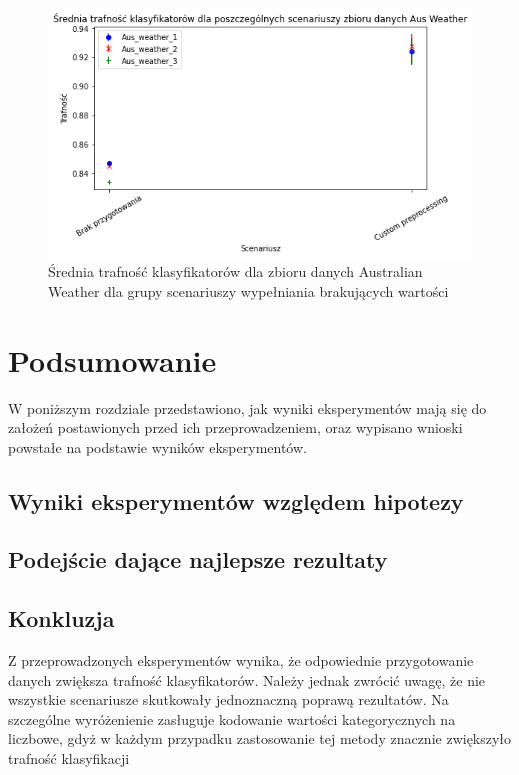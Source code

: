 \documentclass{book}
\begin{document}
\begin{figure}[H]
    \centerline{\includegraphics[scale=0.5]{Aus_Weather_Avg_Custom}}
    \centering
    \caption{Średnia trafność klasyfikatorów dla zbioru danych Australian Weather 
    dla grupy scenariuszy wypełniania brakujących wartości}
    \end{figure}


\chapter{Podsumowanie}

W poniższym rozdziale przedstawiono, jak wyniki eksperymentów mają się do założeń postawionych 
przed ich przeprowadzeniem, oraz wypisano wnioski powstałe na podstawie wyników eksperymentów.

\section{Wyniki eksperymentów względem hipotezy}

\section{Podejście dające najlepsze rezultaty}

\section{Konkluzja}

Z przeprowadzonych eksperymentów wynika, 
że odpowiednie przygotowanie danych zwiększa trafność 
klasyfikatorów. Należy jednak zwrócić uwagę, że nie wszystkie 
scenariusze skutkowały jednoznaczną poprawą rezultatów. 
Na szczególne wyróżenienie zasługuje kodowanie wartości 
kategorycznych na liczbowe, gdyż w każdym przypadku zastosowanie 
tej metody znacznie zwiększyło trafność klasyfikacji
\end{document}
